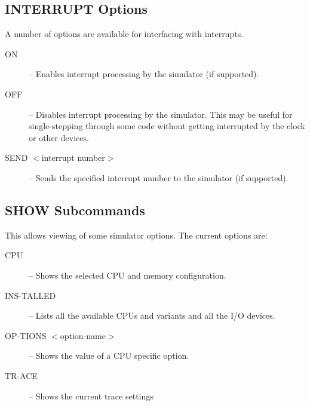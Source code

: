 \documentclass[10pt, openany]{book}
\begin{document}
\subsection{INTERRUPT Options}
A number of options are available for interfacing with interrupts.
\begin{description}
  \item[ON] -- Enables interrupt processing by the simulator (if supported).
  \item[OFF] -- Disables interrupt processing by the simulator.  This may be useful for single-stepping through some code without getting interrupted by the clock or other devices.
  \item[SEND $<$interrupt number$>$] --  Sends the specified interrupt number to the simulator (if supported).
\end{description}

\subsection{SHOW Subcommands}
\label{cmd-show}
This allows viewing of some simulator options.
The current options are:
\begin{description}
  \item[CPU] -- Shows the selected CPU and memory configuration.
  \item[INS-TALLED] -- Lists all the available CPUs and variants and all the I/O devices.
  \item[OP-TIONS $<$option-name$>$] -- Shows the value of a CPU specific option.
  \item[TR-ACE] -- Shows the current trace settings
\end{description}
\end{document}
